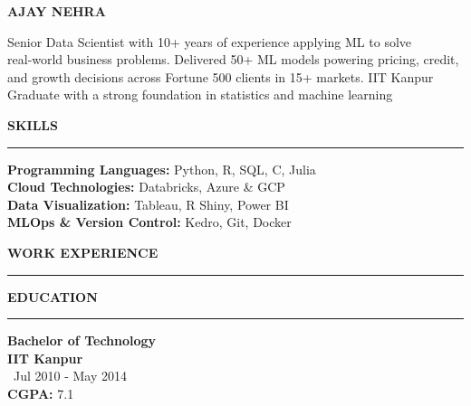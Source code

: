 \documentclass[a4paper,10pt]{article}
\begin{document}
\begin{center}
    \textbf{\LARGE \MakeUppercase{Ajay Nehra}} \\
    \vspace{1mm}
\end{center}

\vspace{1mm}

{\large
Senior Data Scientist with 10+ years of experience applying ML to solve real‑world business problems. Delivered 50+ ML models powering pricing, credit, and growth decisions across Fortune 500 clients in 15+ markets. IIT Kanpur Graduate with a strong foundation in statistics and machine learning
}

\vspace{1mm}

\textbf{\LARGE \MakeUppercase{Skills}} \\
\rule{\textwidth}{0.8pt}
\textbf{Programming Languages:} Python, R, SQL, C, Julia\\
\textbf{Cloud Technologies:} Databricks, Azure \& GCP\\
\textbf{Data Visualization:} Tableau, R Shiny, Power BI \\
\textbf{MLOps \& Version Control:} Kedro, Git, Docker

\vspace{1mm}

\textbf{\LARGE \MakeUppercase{Work Experience}} \\
\rule{\textwidth}{0.8pt}



\textbf{\LARGE \MakeUppercase{Education}} \\
\rule{\textwidth}{0.8pt}
\textbf{Bachelor of Technology} \\
\textbf{IIT Kanpur} \\
\faCalendar \, Jul 2010 - May 2014 \\
\textbf{CGPA:} 7.1
\end{document}
